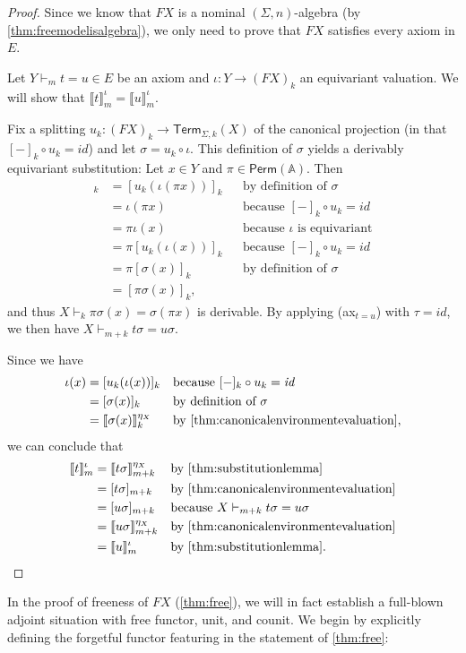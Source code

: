 \documentclass[a4paper,UKenglish,cleveref,thm-restate,numberwithinsect,final]{lipics-v2021}
\newcommand{\Perm}{\mathsf{Perm}(\Names)}
\newcommand{\Term}{\mathsf{Term}}
\newcommand{\sig}{\Sigma}
\newcommand{\Names}{\mathbb{A}}
\theoremstyle{plain}
\newcommand{\id}{\mathit{id}}
\numberwithin{equation}{section}
\newcommand{\+}[1]{\mathcal{#1}\xspace}
\theoremstyle{definition}
\begin{document}
\begin{proof}
    Since we know that \(FX\) is a nominal \((\sig, n)\)-algebra (by \cref{thm:freemodelisalgebra}), we only need to prove that \(FX\) satisfies every axiom in \(E\).

    Let \(Y \vdash_m t = u \in E\) be an axiom and \(\iota: Y \to (FX)_k\) an equivariant valuation.
    We will show that \(\llbracket t \rrbracket^\iota_m = \llbracket u \rrbracket^\iota_m\).

    Fix a splitting \(u_k: (FX)_k \to \Term_{\sig, k}(X)\) of the canonical projection (in that \([-]_k \circ u_k = \id\)) and let \(\sigma = u_k \circ \iota\).
    This definition of \(\sigma\) yields a derivably equivariant substitution:
    Let \(x \in Y\) and \(\pi \in \Perm\).
    Then
    \begin{align*}
        [\sigma(\pi x)]_k
        &= [u_k(\iota(\pi x))]_k && \text{by definition of } \sigma \\
        &= \iota(\pi x) && \text{because } [-]_k \circ u_k = \id \\
        &= \pi \iota(x) && \text{because } \iota \text{ is equivariant} \\
        &= \pi[u_k(\iota(x))]_k && \text{because } [-]_k \circ u_k = \id \\
        &= \pi[\sigma(x)]_k && \text{by definition of } \sigma \\
        &= [\pi \sigma(x)]_k, &&
    \end{align*}
    and thus \(X \vdash_k \pi \sigma(x) = \sigma(\pi x)\) is derivable.
    By applying (ax$_{t = u}$) with \(\tau = \id\), we then have \(X \vdash_{m + k} t\sigma = u\sigma\).

    Since we have
    \begin{align*}
        \iota(x)
        &= [u_k(\iota(x))]_k && \text{because } [-]_k \circ u_k = \id \\
        &= [\sigma(x)]_k && \text{by definition of } \sigma \\
        &= \llbracket \sigma(x) \rrbracket^{\eta_X}_k && \text{by \cref{thm:canonicalenvironmentevaluation}},
    \end{align*}
    we can conclude that
    \begin{align*}
        \llbracket t \rrbracket^\iota_m
        &= \llbracket t\sigma \rrbracket^{\eta_X}_{m + k} && \text{by \cref{thm:substitutionlemma}} \\
        &= [t\sigma]_{m + k} && \text{by \cref{thm:canonicalenvironmentevaluation}} \\
        &= [u\sigma]_{m + k} && \text{because } X \vdash_{m + k} t\sigma = u\sigma \\
        &= \llbracket u\sigma \rrbracket^{\eta_X}_{m + k} && \text{by \cref{thm:canonicalenvironmentevaluation}} \\
        &= \llbracket u \rrbracket^\iota_m && \text{by \cref{thm:substitutionlemma}}.
    \end{align*}
\end{proof}
\noindent In the proof of freeness of $FX$ (\cref{thm:free}), we
will in fact establish a full-blown adjoint situation with free
functor, unit, and counit. We begin by explicitly defining the
forgetful functor featuring in the statement of \cref{thm:free}:
\end{document}

